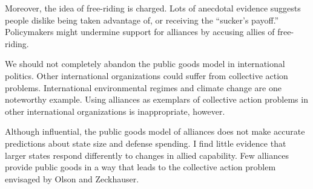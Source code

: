 \documentclass[12pt]{article}
\begin{document}
Moreover, the idea of free-riding is charged. 
Lots of anecdotal evidence suggests people dislike being taken advantage of, or receiving the ``sucker's payoff.'' 
Policymakers might undermine support for alliances by accusing allies of free-riding. 


We should not completely abandon the public goods model in international politics. 
Other international organizations could suffer from collective action problems.
International environmental regimes and climate change are one noteworthy example.  
Using alliances as exemplars of collective action problems in other international organizations is inappropriate, however. 


Although influential, the public goods model of alliances does not make accurate predictions about state size and defense spending. 
I find little evidence that larger states respond differently to changes in allied capability. 
Few alliances provide public goods in a way that leads to the collective action problem envisaged by Olson and Zeckhauser. 



\singlespace


 
\end{document}
